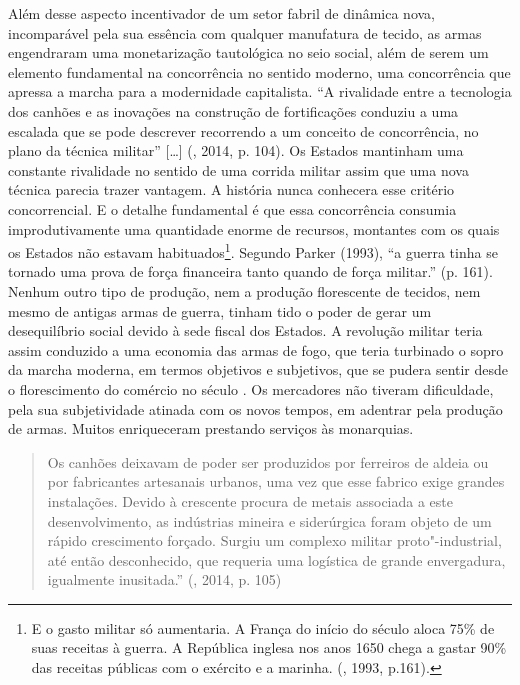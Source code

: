 Além desse aspecto incentivador de um setor fabril de dinâmica nova,
incomparável pela sua essência com qualquer manufatura de tecido, as
armas engendraram uma monetarização tautológica no seio social, além de
serem um elemento fundamental na concorrência no sentido moderno, uma
concorrência que apressa a marcha para a modernidade capitalista. ``A
rivalidade entre a tecnologia dos canhões e as inovações na construção
de fortificações conduziu a uma escalada que se pode descrever
recorrendo a um conceito de concorrência, no plano da técnica militar''
[\ldots{}] (, 2014, p. 104). Os Estados mantinham uma constante
rivalidade no sentido de uma corrida militar assim que uma nova técnica
parecia trazer vantagem. A história nunca conhecera esse critério
concorrencial. E o detalhe fundamental é que essa concorrência consumia
improdutivamente uma quantidade enorme de recursos, montantes com os
quais os Estados não estavam habituados\footnote{E o gasto militar só
  aumentaria. A França do início do século  aloca 75\% de suas
  receitas à guerra. A República inglesa nos anos 1650 chega a gastar
  90\% das receitas públicas com o exército e a marinha. (, 1993,
  p.161).}. Segundo Parker (1993), ``a guerra tinha se tornado uma prova
de força financeira tanto quando de força militar.'' (p. 161). Nenhum
outro tipo de produção, nem a produção florescente de tecidos, nem mesmo
de antigas armas de guerra, tinham tido o poder de gerar um
desequilíbrio social devido à sede fiscal dos Estados. A revolução
militar teria assim conduzido a uma economia das armas de fogo, que
teria turbinado o sopro da marcha moderna, em termos objetivos e
subjetivos, que se pudera sentir desde o florescimento do comércio no
século . Os mercadores não tiveram dificuldade, pela sua subjetividade
atinada com os novos tempos, em adentrar pela produção de armas. Muitos
enriqueceram prestando serviços às monarquias.

\begin{quote}
Os canhões deixavam de poder ser produzidos por ferreiros de aldeia ou
por fabricantes artesanais urbanos, uma vez que esse fabrico exige
grandes instalações. Devido à crescente procura de metais associada a
este desenvolvimento, as indústrias mineira e siderúrgica foram objeto
de um rápido crescimento forçado. Surgiu um complexo militar
proto"-industrial, até então desconhecido, que requeria uma logística de
grande envergadura, igualmente inusitada.'' (, 2014, p. 105)
\end{quote}

